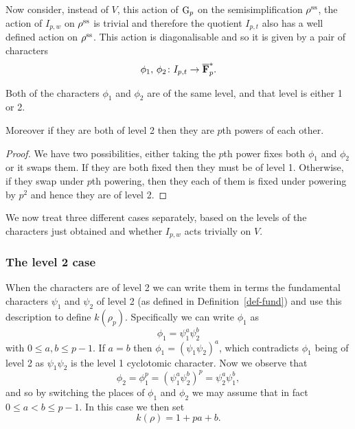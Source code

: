 \documentclass[a4paper,12pt]{article}
\begin{document}
Now consider, instead of $V$, this action of $\mathrm{G}_p$ on the semisimplification $\rho^\text{ss}$, the action of $I_{p,w}$ on $\rho^\text{ss}$ is trivial and therefore the quotient $I_{p,t}$ also has a well defined action on $\rho^\text{ss}$.
This action is diagonalisable and so it is given by a pair of characters
\[
\phi_1,\,\phi_2\colon I_{p,t} \to \overline{\mathbf{F}}_p^*.
\]

\begin{prop}
Both of the characters $\phi_1$ and $\phi_2$ are of the same level, and that level is either 1 or 2.

Moreover if they are both of level 2 then they are $p$th powers of each other.
\end{prop}
\begin{proof}
We have two possibilities, either taking the $p$th power fixes both $\phi_1$ and $\phi_2$ or it swaps them.
If they are both fixed then they must be of level 1.
Otherwise, if they swap under $p$th powering, then they each of them is fixed under powering by $p^2$ and hence they are of level 2.
\end{proof}

We now treat three different cases separately, based on the levels of the characters just obtained and whether $I_{p,w}$ acts trivially on $V$.

\subsubsection{The level 2 case}
When the characters are of level 2 we can write them in terms the fundamental characters $\psi_1$ and $\psi_2$ of level 2 (as defined in Definition~\ref{def-fund}) and use this description to define $k(\rho_p)$.
Specifically we can write $\phi_1$ as
\[
\phi_1 = \psi_1^a\psi_2^b
\]
with $0\le a,b\le p-1$.
If $a = b$ then $\phi_1 = (\psi_1 \psi_2)^a$, which contradicts $\phi_1$ being of level 2 as $\psi_1\psi_2$ is the level 1 cyclotomic character.
Now we observe that
\[
\phi_2 = \phi_1^p = (\psi_1^a\psi_2^b)^p = \psi_2^a\psi_1^b,
\]
and so by switching the places of $\phi_1$ and $\phi_2$ we may assume that in fact $0\le a < b\le p-1$.
In this case we then set
\[
k(\rho) = 1 + pa + b.
\]
\end{document}
